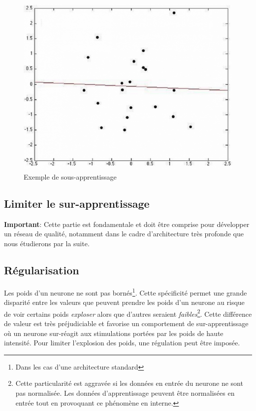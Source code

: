 \begin{figure}
    \centering
    \includegraphics[scale=0.3]{./tex/regularisation/sousapp.png}
    \caption{Exemple de sous-apprentissage}
    \label{sousapp}
\end{figure}

\subsection{Limiter le sur-apprentissage}

\textbf{Important}: Cette partie est fondamentale et doit être comprise pour développer un réseau de qualité, notamment dans le cadre d'architecture très profonde que nous étudierons par la suite.\\

\subsection{Régularisation}
\label{regsec}

Les poids d'un neurone ne sont pas bornés\footnote{Dans les cas d'une architecture standard}. Cette spécificité permet une grande disparité entre les valeurs que peuvent prendre les poids d'un neurone au risque de voir certains poids \textit{exploser} alors que d'autres seraient \textit{faibles}\footnote{Cette particularité est aggravée si les données en entrée du neurone ne sont pas normalisée. Les données d'apprentissage peuvent être normalisées en entrée tout en provoquant ce phénomène en interne.}. Cette différence de valeur est très préjudiciable et favorise un comportement de sur-apprentissage où un neurone sur-réagit aux stimulations portées par les poids de haute intensité. Pour limiter l'explosion des poids, une régulation peut être imposée. \\

